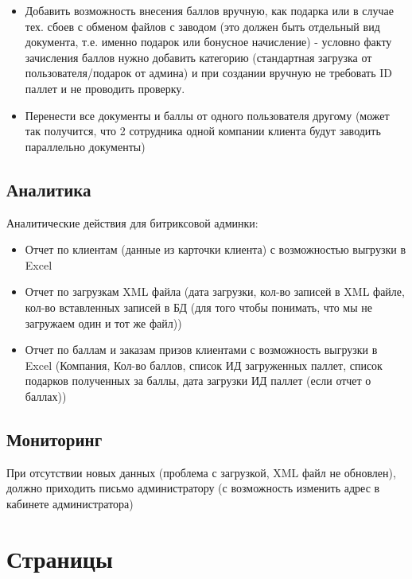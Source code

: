 \documentclass[DIV=calc, paper=a4, fontsize=11pt]{scrartcl} %
\begin{document}
\begin{itemize}
	\item Добавить возможность внесения баллов вручную, как подарка или в случае тех. сбоев с обменом файлов с заводом (это должен быть отдельный вид документа, т.е. именно подарок или бонусное начисление) - условно факту зачисления баллов нужно добавить категорию (стандартная загрузка от пользователя/подарок от админа) и при создании вручную не требовать ID паллет и не проводить проверку.
	\item Перенести все документы и баллы от одного пользователя другому (может так получится, что 2 сотрудника одной компании клиента будут заводить параллельно документы)
\end{itemize}


\subsection{Аналитика}

Аналитические действия для битриксовой админки:

\begin{itemize}
	\item Отчет по клиентам (данные из карточки клиента) с возможностью выгрузки в Excel
	\item Отчет по загрузкам XML файла (дата загрузки, кол-во записей в XML файле, кол-во вставленных записей в БД (для того чтобы понимать, что мы не загружаем один и тот же файл))
	\item Отчет по баллам и заказам призов клиентами с возможность выгрузки в Excel (Компания, Кол-во баллов, список ИД  загруженных паллет, список подарков полученных за баллы, дата загрузки ИД паллет (если отчет о баллах))

\end{itemize}

\subsection{Мониторинг}
При отсутствии новых данных (проблема с загрузкой, XML файл не обновлен), должно приходить письмо администратору (с возможность изменить адрес в кабинете администратора)




\section{Страницы}
\end{document}
